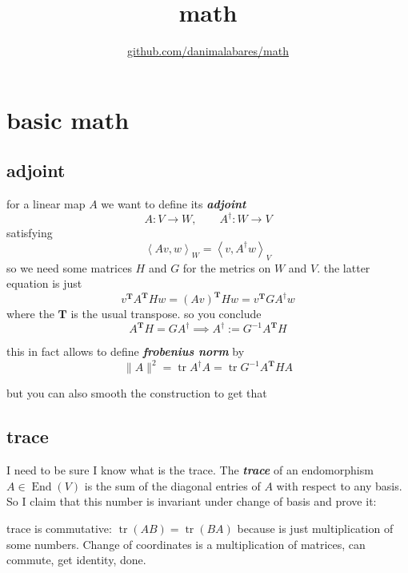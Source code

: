 
\usepackage{textgreek}
\title{math}
\author{\href{https://github.com/danimalabares/math}{github.com/danimalabares/math}}





\maketitle
{}
\tableofcontents
\clearpage
\chapter{basic math}

\section{adjoint}

for a linear map \(A\) we want to define its \textit{\textbf{adjoint}}
\[A:V \to W, \qquad A^{\dag}:W \to V\]
satisfying
\[\left<Av,w\right>_W=\left<v,A^\dag w\right>_V\]
so we need some matrices \(H\) and \(G\) for the metrics on \(W\) and \(V\). the latter equation is just
\[v^{\mathbf{T}}A^{\mathbf{T}}Hw=(Av)^{\mathbf{T}}Hw=v^{\mathbf{T}}GA^\dag w\]
where the \(\mathbf{T}\) is the usual transpose. so you conclude
\[A^{\mathbf{T}}H=GA^\dag \implies A^\dag:=G^{-1}A^{\mathbf{T}}H\]

this in fact allows to define \textit{\textbf{frobenius norm}} by
\[\|A\|^2=\operatorname{tr}A^\dag A=\operatorname{tr}G^{-1}A^{\mathbf{T}}HA\]

but you can also smooth the construction to get that 

\section{trace}

I need to be sure I know what is the trace. The \textit{\textbf{trace}} of an endomorphism \(A \in \operatorname{End}(V)\) is the sum of the diagonal entries of \(A\) with respect to any basis. So I claim that this number is invariant under change of basis and prove it:

trace is commutative: \(\operatorname{tr}(AB)=\operatorname{tr}(BA)\) because is just multiplication of some numbers. Change of coordinates is a multiplication of matrices, can commute, get identity, done.

